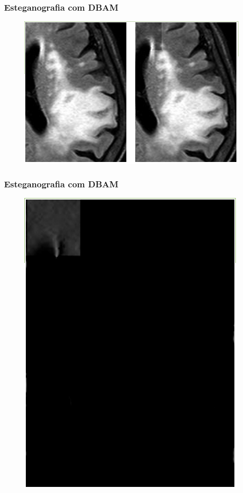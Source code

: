 \documentclass{beamer}
\begin{document}
\begin{frame}
\frametitle{Esteganografia com DBAM}
\begin{figure}
\includegraphics[scale=.2]{DBAM.png} 

\end{figure}
\end{frame}
\begin{frame}
\frametitle{Esteganografia com DBAM}
\begin{figure}
\includegraphics[scale=.2]{DBAMdiff.png} 

\end{figure}
\end{frame}
\end{document}
